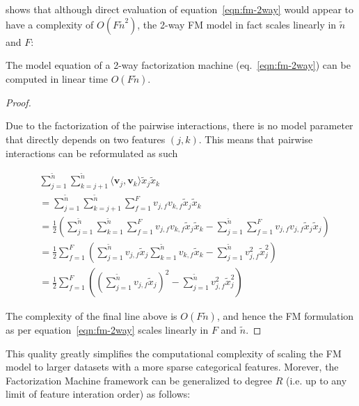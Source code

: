 \documentclass{mldsmsc}
\begin{document}
\cite{RefWorks:rendle2010factorization} shows that although direct evaluation
of equation~\ref{eqn:fm-2way} would appear to have a complexity of $O(F \tilde{n}^2)$, the 2-way
FM model in fact scales linearly in $\tilde{n}$ and $F$:

\begin{lemma}
\label{lemma:fm-linearity}
The model equation of a 2-way factorization machine (eq.~\ref{eqn:fm-2way}) can
be computed in linear time $O(F\tilde{n})$.
\end{lemma}

\begin{proof}
\label{prf:fm-linearity}

Due to the factorization of the pairwise interactions, there is no model
parameter that directly depends on two features $(j,k)$. This means that
pairwise interactions can be reformulated as such

\begin{align*}
    &\sum_{j=1}^{\tilde{n}} \sum_{k=j+1}^{\tilde{n}} \langle \mathbf{v}_j , \mathbf{v}_k \rangle \tilde{x}_j \tilde{x}_k \\
    &= \sum_{j=1}^{\tilde{n}} \sum_{k=j+1}^{\tilde{n}} 
    \sum_{f=1}^{F}v_{j,f} v_{k,f}\tilde{x}_j \tilde{x}_k \\
    &= \frac{1}{2} \left( \sum_{j=1}^{\tilde{n}} \sum_{k=1}^{\tilde{n}}
    \sum_{f=1}^{F} v_{j,f} v_{k,f} \tilde{x}_j \tilde{x}_k -
    \sum_{j=1}^{\tilde{n}} \sum_{f=1}^{F}v_{j,f} v_{j,f} \tilde{x}_j \tilde{x}_j \right)\\
    &=\frac{1}{2}\sum_{f=1}^{F} \left( \sum_{j=1}^{\tilde{n}}v_{j,f} \tilde{x}_j
    \sum_{k=1}^{\tilde{n}} v_{k,f} \tilde{x}_k - \sum_{j=1}^{\tilde{n}}
    v_{j,f}^2 \tilde{x}_j^2 \right)\\
    &= \frac{1}{2}\sum_{f=1}^{F} \left( \left(\sum_{j=1}^{\tilde{n}}v_{j,f} \tilde{x}_j\right)^2
    - \sum_{j=1}^{\tilde{n}} v_{j,f}^2 \tilde{x}_j^2 \right)
\end{align*}

The complexity of the final line above is $O(F\tilde{n})$, and hence the FM formulation
as per equation~\ref{eqn:fm-2way} scales linearly in $F$ and $\tilde{n}$.
\end{proof}

This quality greatly simplifies the computational complexity of scaling the FM model to larger
datasets with a more sparse categorical features. Morever, the Factorization Machine framework
can be generalized to degree $R$ (i.e. up to any limit of feature interation order) as follows:
\end{document}
